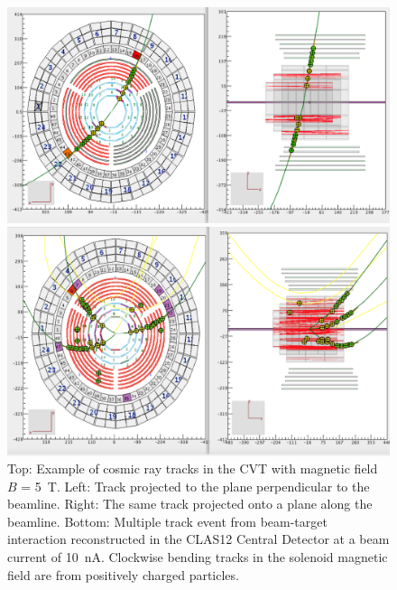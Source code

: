 \documentclass[final,3p]{elsarticle}
\begin{document}
\begin{twocolumn}
\begin{figure}[th!]
\centerline{\includegraphics[width=1.0\columnwidth]{cvt-cosmic-w-solenoid.png}}
\vspace{-0.5cm}\centerline{\includegraphics[width=1.0\columnwidth]{cvt-3-tracks.png}}
\caption{Top: Example of cosmic ray tracks in the CVT with magnetic field $B$ = 5~T. Left: Track projected to the
  plane perpendicular to the beamline. Right: The same track projected onto a plane along the beamline. Bottom: Multiple
  track event from beam-target interaction reconstructed in the CLAS12 Central Detector at a beam current of 10~nA.
  Clockwise bending tracks in the solenoid magnetic field are from positively charged particles.}
\label{cvt-tracks}
\end{figure}


\end{twocolumn}
\end{document}
